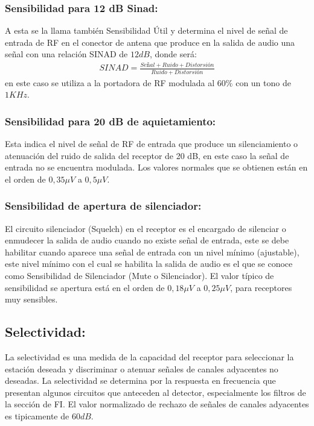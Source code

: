 \documentclass[a4paper,10pt,spanish]{report}
\begin{document}
\subsubsection{Sensibilidad para 12 dB Sinad:}
\label{\detokenize{introduccion/sistemas:Sensibilidad-para-12-dB-Sinad:}}
A esta se la llama también Sensibilidad Útil y determina el nivel de señal de entrada de RF en el conector de antena que produce en la salida de audio una señal con una relación SINAD de \(12 dB\), donde será:
\begin{equation*}
\begin{split}SINAD = \frac{Señal + Ruido + Distorsión}{Ruido + Distorsión}\end{split}
\end{equation*}
en este caso se utiliza a la portadora de RF modulada al \(60 \%\) con un tono de \(1 KHz\).


\subsubsection{Sensibilidad para 20 dB de aquietamiento:}
\label{\detokenize{introduccion/sistemas:Sensibilidad-para-20-dB-de-aquietamiento:}}
Esta indica el nivel de señal de RF de entrada que produce un silenciamiento o atenuación del ruido de salida del receptor de 20 dB, en este caso la señal de entrada no se encuentra modulada. Los valores normales que se obtienen están en el orden de \(0,35 \mu V\) a \(0,5 \mu V\).


\subsubsection{Sensibilidad de apertura de silenciador:}
\label{\detokenize{introduccion/sistemas:Sensibilidad-de-apertura-de-silenciador:}}
El circuito silenciador (Squelch) en el receptor es el encargado de silenciar o enmudecer la salida de audio cuando no existe señal de entrada, este se debe habilitar cuando aparece una señal de entrada con un nivel mínimo (ajustable), este nivel mínimo con el cual se habilita la salida de audio es el que se conoce como Sensibilidad de Silenciador (Mute o Silenciador). El valor típico de sensibilidad se apertura está en el orden de \(0,18 \mu V\) a \(0,25 \mu V\), para receptores muy
sensibles.


\subsection{Selectividad:}
\label{\detokenize{introduccion/sistemas:Selectividad:}}
La selectividad es una medida de la capacidad del receptor para seleccionar la estación deseada y discriminar o atenuar señales de canales adyacentes no deseadas. La selectividad se determina por la respuesta en frecuencia que presentan algunos circuitos que anteceden al detector, especialmente los filtros de la sección de FI. El valor normalizado de rechazo de señales de canales adyacentes es tipicamente de \(60 dB\).
\end{document}
